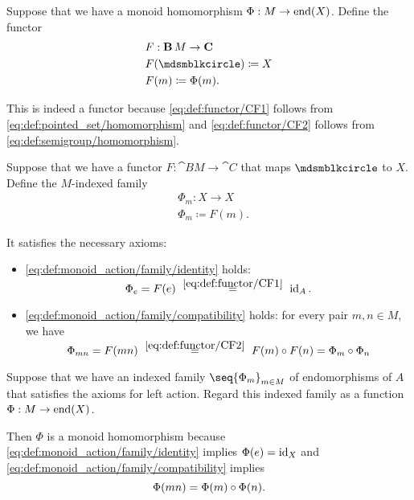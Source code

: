\begin{defproof}
   Suppose that we have a monoid homomorphism \( \Phi: M \to \operatorname{end}(X) \). Define the functor
  \begin{equation*}
    \begin{aligned}
      &F: \cat{B} M \to \cat{C} \\
      &F(\Anon) \coloneqq X \\
      &F(m) \coloneqq \Phi(m).
    \end{aligned}
  \end{equation*}

  This is indeed a functor because \eqref{eq:def:functor/CF1} follows from \eqref{eq:def:pointed_set/homomorphism} and \eqref{eq:def:functor/CF2} follows from \eqref{eq:def:semigroup/homomorphism}.

   Suppose that we have a functor \( F: \cat{B} M \to \cat{C} \) that maps \( \Anon \) to \( X \). Define the \( M \)-indexed family
  \begin{equation*}
    \begin{aligned}
      &\Phi_m: X \to X \\
      &\Phi_m \coloneqq F(m).
    \end{aligned}
  \end{equation*}

  It satisfies the necessary axioms:
  \begin{itemize}
    \item \ref{eq:def:monoid_action/family/identity} holds:
    \begin{equation*}
      \Phi_e
      =
      F(e)
      \reloset {\eqref{eq:def:functor/CF1}} =
      \id_A.
    \end{equation*}

    \item \ref{eq:def:monoid_action/family/compatibility} holds: for every pair \( m, n \in M \), we have
    \begin{equation*}
      \Phi_{mn}
      =
      F(mn)
      \reloset {\eqref{eq:def:functor/CF2}} =
      F(m) \bincirc F(n)
      =
      \Phi_m \bincirc \Phi_n
    \end{equation*}
  \end{itemize}

   Suppose that we have an indexed family \( \seq{ \Phi_m }_{m \in M} \) of endomorphisms of \( A \) that satisfies the axioms for left action. Regard this indexed family as a function \( \Phi: M \to \operatorname{end}(X) \).

  Then \( \Phi \) is a monoid homomorphism because \ref{eq:def:monoid_action/family/identity} implies \( \Phi(e) = \operatorname{id}_X \) and \eqref{eq:def:monoid_action/family/compatibility} implies
  \begin{equation*}
    \Phi(mn) = \Phi(m) \bincirc \Phi(n).
  \end{equation*}
\end{defproof}

